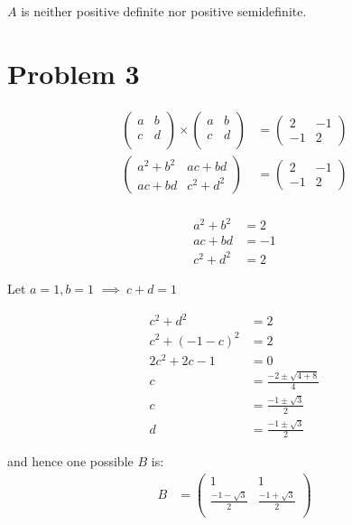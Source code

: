 \documentclass[a4paper]{article}
\begin{document}
$A$ is neither positive definite nor positive semidefinite.

\section*{Problem 3}

\begin{align*}
\begin{pmatrix}
a & b\\
c & d\\
\end{pmatrix}\times \begin{pmatrix}
a & b\\
c & d\\
\end{pmatrix} &= \begin{pmatrix}
2 & -1\\
-1 & 2
\end{pmatrix}\\
\begin{pmatrix}
a^2+b^2 & ac+bd\\
ac+bd & c^2+d^2
\end{pmatrix}&=\begin{pmatrix}
2 & -1\\
-1 & 2
\end{pmatrix}\\
\end{align*}

\begin{align*}
a^2+b^2 &=2\\
ac+bd&=-1\\
c^2+d^2&=2
\end{align*}

Let $a=1,b=1$ $\implies \ c+d=1 $ 

\begin{align*}
c^2+d^2 &=2\\
c^2+(-1-c)^2 & =2\\
2c^2+2c-1 &=0\\
c &= \frac{-2\pm\sqrt{4+8}}{4}\\
c &= \frac{-1\pm\sqrt{3}}{2}\\
d &= \frac{-1\pm\sqrt{3}}{2}
\end{align*}

and hence one possible $B$ is:
\begin{align*}
B &=\begin{pmatrix}
1 & 1\\
\frac{-1-\sqrt{3}}{2} & \frac{-1+\sqrt{3}}{2}\\
\end{pmatrix}
\end{align*}
\end{document}
